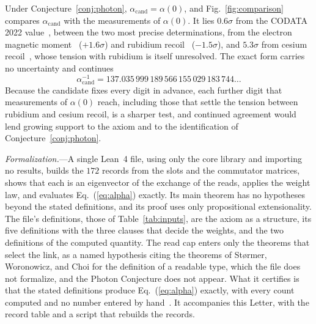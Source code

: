 \documentclass[aps,prl,reprint,superscriptaddress,longbibliography,nofootinbib,floatfix]{revtex4-2}
\theoremstyle{definition}
\begin{document}
Under Conjecture~\ref{conj:photon}, $\alpha_{\mathrm{cand}}=\alpha(0)$, and Fig.~\ref{fig:comparison} compares $\alpha_{\mathrm{cand}}$ with the measurements of $\alpha(0)$. It lies $0.6\sigma$ from the CODATA 2022 value~\cite{codata2022}, between the two most precise determinations, from the electron magnetic moment~\cite{fan2023} ($+1.6\sigma$) and rubidium recoil~\cite{morel2020} ($-1.5\sigma$), and $5.3\sigma$ from cesium recoil~\cite{parker2018}, whose tension with rubidium is itself unresolved. The exact form carries no uncertainty and continues
\begin{equation}
\alpha_{\mathrm{cand}}^{-1} = 137.035\,999\,189\,566\,155\,029\,183\,744\ldots
\label{eq:prediction}
\end{equation}
Because the candidate fixes every digit in advance, each further digit that measurements of $\alpha(0)$ reach, including those that settle the tension between rubidium and cesium recoil, is a sharper test, and continued agreement would lend growing support to the axiom and to the identification of Conjecture~\ref{conj:photon}.



\emph{Formalization.}---A single Lean~4 file, using only the core library and importing no results, builds the $172$ records from the slots and the commutator matrices, shows that each is an eigenvector of the exchange of the reads, applies the weight law, and evaluates Eq.~(\ref{eq:alpha}) exactly. Its main theorem has no hypotheses beyond the stated definitions, and its proof uses only propositional extensionality. The file's definitions, those of Table~\ref{tab:inputs}, are the axiom as a structure, its five definitions with the three clauses that decide the weights, and the two definitions of the computed quantity. The read cap enters only the theorems that select the link, as a named hypothesis citing the theorems of St{\o}rmer, Woronowicz, and Choi for the definition of a readable type, which the file does not formalize, and the Photon Conjecture does not appear. What it certifies is that the stated definitions produce Eq.~(\ref{eq:alpha}) exactly, with every count computed and no number entered by hand~\cite{SM}. It accompanies this Letter, with the record table and a script that rebuilds the records.
\end{document}
